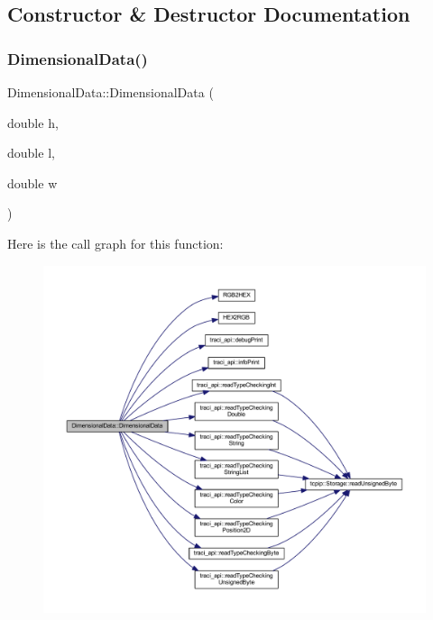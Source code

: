 \subsection{Constructor \& Destructor Documentation}
\mbox{\label{class_dimensional_data_a85c1d983a7dbe67ed9d93336e37b2b74}} 
\subsubsection{\texorpdfstring{Dimensional\+Data()}{DimensionalData()}}
{\footnotesize\ttfamily Dimensional\+Data\+::\+Dimensional\+Data (\begin{DoxyParamCaption}\item[{double}]{h,  }\item[{double}]{l,  }\item[{double}]{w }\end{DoxyParamCaption})\hspace{0.3cm}{\ttfamily [inline]}}

Here is the call graph for this function\+:
\nopagebreak
\begin{figure}[H]
\begin{center}
\leavevmode
\includegraphics[width=350pt]{class_dimensional_data_a85c1d983a7dbe67ed9d93336e37b2b74_cgraph}
\end{center}
\end{figure}


